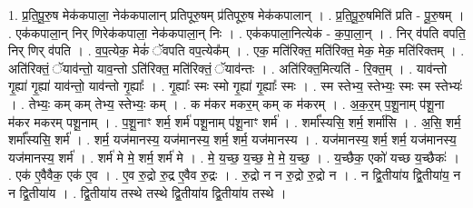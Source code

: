 \documentclass[17pt]{extarticle}
\begin{document}
1. प्र॒ति॒पू॒रु॒ष मेक॑कपाला॒ नेक॑कपालान् प्रतिपूरु॒षम् प्र॑तिपूरु॒ष मेक॑कपालान् । . प्र॒ति॒पू॒रु॒षमिति॑ प्रति - पू॒रु॒षम् । . एक॑कपाला॒न् निर् णिरेक॑कपाला॒ नेक॑कपाला॒न् निः । . एक॑कपाला॒नित्येक॑ - क॒पा॒ला॒न् । . निर् व॑पति वपति॒ निर् णिर् व॑पति । . व॒प॒त्येक॒ मेकं॑ ॅवपति वप॒त्येक᳚म् । . एक॒ मति॑रिक्त॒ मति॑रिक्त॒ मेक॒ मेक॒ मति॑रिक्तम् । . अति॑रिक्तं॒ ॅयाव॑न्तो॒ याव॒न्तो ऽति॑रिक्त॒ मति॑रिक्तं॒ ॅयाव॑न्तः । . अति॑रिक्त॒मित्यति॑ - रि॒क्त॒म् । . याव॑न्तो गृ॒ह्या॑ गृ॒ह्या॑ याव॑न्तो॒ याव॑न्तो गृ॒ह्याः᳚ । . गृ॒ह्याः᳚ स्मः स्मो गृ॒ह्या॑ गृ॒ह्याः᳚ स्मः । . स्म स्तेभ्य॒ स्तेभ्यः॒ स्मः स्म स्तेभ्यः॑ । . तेभ्यः॒ कम् कम् तेभ्य॒ स्तेभ्यः॒ कम् । . क म॑कर मकर॒म् कम् क म॑करम् । . अ॒क॒र॒म् प॒शू॒नाम् प॑शू॒ना म॑कर मकरम् पशू॒नाम् । . प॒शू॒नाꣳ शर्म॒ शर्म॑ पशू॒नाम् प॑शू॒नाꣳ शर्म॑ । . शर्मा᳚स्यसि॒ शर्म॒ शर्मा॑सि । . अ॒सि॒ शर्म॒ शर्मा᳚स्यसि॒ शर्म॑ । . शर्म॒ यज॑मानस्य॒ यज॑मानस्य॒ शर्म॒ शर्म॒ यज॑मानस्य । . यज॑मानस्य॒ शर्म॒ शर्म॒ यज॑मानस्य॒ यज॑मानस्य॒ शर्म॑ । . शर्म॑ मे मे॒ शर्म॒ शर्म॑ मे । . मे॒ य॒च्छ॒ य॒च्छ॒ मे॒ मे॒ य॒च्छ॒ । . य॒च्छैक॒ एको॑ यच्छ य॒च्छैकः॑ । . एक॑ ए॒वैवैक॒ एक॑ ए॒व । . ए॒व रु॒द्रो रु॒द्र ए॒वैव रु॒द्रः । . रु॒द्रो न न रु॒द्रो रु॒द्रो न । . न द्वि॒तीया॑य द्वि॒तीया॑य॒ न न द्वि॒तीया॑य । . द्वि॒तीया॑य तस्थे तस्थे द्वि॒तीया॑य द्वि॒तीया॑य तस्थे । \newline
\end{document}
